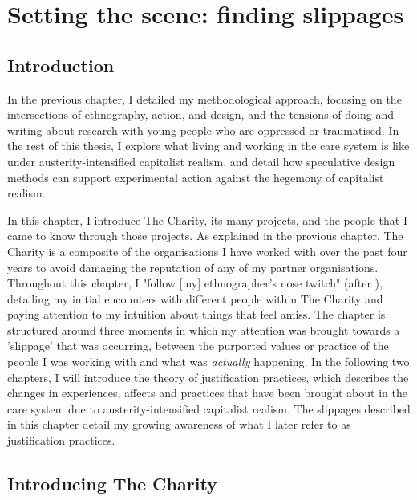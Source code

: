 \chapter{Setting the scene: finding slippages}
\label{ch:4}

\section{Introduction}
\label{sec:4-intro}

In the previous chapter, I detailed my methodological approach, focusing on the intersections of ethnography, action, and design, and the tensions of doing and writing about research with young people who are oppressed or traumatised. In the rest of this thesis, I explore what living and working in the care system is like under austerity-intensified capitalist realism, and detail how speculative design methods can support experimental action against the hegemony of capitalist realism. 

In this chapter, I introduce The Charity, its many projects, and the people that I came to know through those projects. As explained in the previous chapter, The Charity is a composite of the organisations I have worked with over the past four years to avoid damaging the reputation of any of my partner organisations. Throughout this chapter, I "follow [my] ethnographer’s nose twitch" (after \cite{leigh_star_this_2010}), detailing my initial encounters with different people within The Charity and paying attention to my intuition about things that feel amiss. The chapter is structured around three moments in which my attention was brought towards a 'slippage' \citep{cutting_making_2021} that was occurring, between the purported values or practice of the people I was working with and what was \textit{actually} happening. In the following two chapters, I will introduce the theory of justification practices, which describes the changes in experiences, affects and practices that have been brought about in the care system due to austerity-intensified capitalist realism. The slippages described in this chapter detail my growing awareness of what I later refer to as justification practices.

\section{Introducing The Charity}

